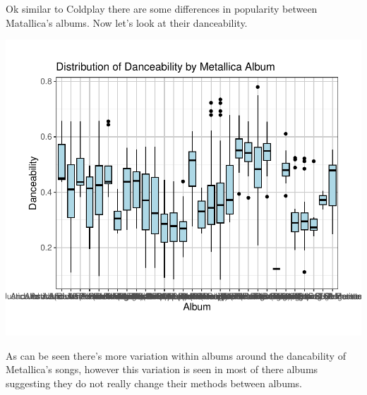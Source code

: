 \documentclass[11pt,preprint, authoryear]{elsarticle}
\numberwithin{equation}{section}
\numberwithin{figure}{section}
\numberwithin{table}{section}
\begin{document}
Ok similar to Coldplay there are some differences in popularity between
Matallica's albums. Now let's look at their danceability.

\includegraphics{Question_3_files/figure-latex/unnamed-chunk-11-1.pdf}

As can be seen there's more variation within albums around the
dancability of Metallica's songs, however this variation is seen in most
of there albums suggesting they do not really change their methods
between albums.


\end{document}
